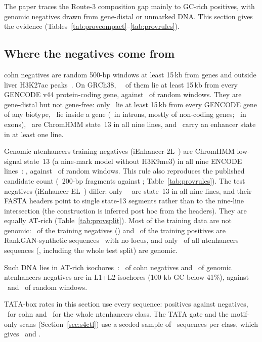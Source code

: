 \documentclass[journal,onecolumn,10pt,letterpaper]{IEEEtran}
\newcommand{\tasku}{\textunderscore\allowbreak}
\DeclareRobustCommand{\task}[1]{{\normalfont\ttfamily\upshape\let\_\tasku #1}}
\begin{document}
The paper traces the Route-3 composition gap mainly to GC-rich positives, with genomic negatives
drawn from gene-distal or unmarked DNA. This section gives the evidence
(Tables~\ref{tab:provcompact}--\ref{tab:provrules}).

\subsection{Where the negatives come from}
\task{cohn} negatives are random 500-bp windows at least 15\,kb from genes and outside liver H3K27ac
peaks~\cite{cohn2018}. On GRCh38, \smCohnPc\ \smCohnPcCI\ of them lie at least 15\,kb from every
GENCODE v44 protein-coding gene, against \smRandPc\ of random windows. They are gene-distal but not
gene-free: only \smCohnAll\ lie at least 15\,kb from every GENCODE gene of any biotype, \smCohnInGene\
lie inside a gene (\smCohnIntron\ in introns, mostly of non-coding genes; \smCohnExon\ in exons),
\smCohnSthirteen\ are ChromHMM state~13 in all nine lines, and \smCohnEnhAny\ carry an enhancer state in
at least one line.

Genomic \task{nt\_enhancers} training negatives (iEnhancer-2L~\cite{liu2016}) are ChromHMM low-signal
state~13 (a nine-mark model without H3K9me3) in all nine ENCODE
lines~\cite{ernst2011}: \smStrainNeg, against \smSrand\ of random windows. This rule also reproduces
the published candidate count (\smRuleCount\ 200-bp fragments against \smRulePub;
Table~\ref{tab:provrules}). The test negatives (iEnhancer-EL~\cite{liu2018}) differ: only
\smStestNeg\ \smStestNegCI\ are state~13 in all nine lines, and their FASTA headers point to single
state-13 segments rather than to the nine-line intersection (the construction is inferred post hoc
from the headers). They are equally AT-rich (Table~\ref{tab:provsplit}). Most of the training data are not genomic: \smSynTrNeg\ of the
training negatives (\smSynTrNegN) and \smSynTrPos\ of the training positives are RankGAN-synthetic
sequences~\cite{geng2022} with no locus, and only \smGenomicAll\ of all \task{nt\_enhancers} sequences
(\smGenomicAllN, including the whole test split) are genomic.

Such DNA lies in AT-rich isochores~\cite{costantini2006}: \smCohnIso\ of \task{cohn} negatives and
\smNtIso\ of genomic \task{nt\_enhancers} negatives are in L1+L2 isochores (100-kb GC below 41\%),
against \smRandIso\ and \smNtRandIso\ of random windows.

TATA-box rates in this section use every sequence: positives against negatives, \smTataAllCohn\ for
\task{cohn} and \smTataAllNt\ for the whole \task{nt\_enhancers} class. The TATA gate and the
motif-only scans (Section~\ref{sec:s4ctl}) use a seeded sample of \smTataSampleN\ sequences per class,
which gives \smTataSubCohn\ and \smTataSubNt.
\end{document}
